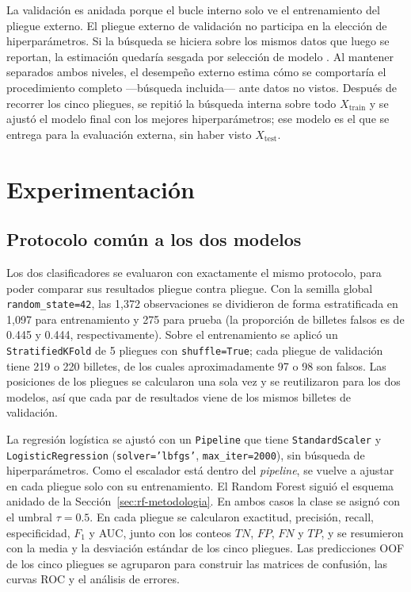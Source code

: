 \documentclass[conference]{IEEEtran}
\begin{document}
    La validación es anidada porque el bucle interno solo ve el entrenamiento del pliegue externo. El pliegue externo de validación no participa en la elección de hiperparámetros. Si la búsqueda se hiciera sobre los mismos datos que luego se reportan, la estimación quedaría sesgada por selección de modelo \cite{cawley2010overfitting,varma2006bias}. Al mantener separados ambos niveles, el desempeño externo estima cómo se comportaría el procedimiento completo —búsqueda incluida— ante datos no vistos. Después de recorrer los cinco pliegues, se repitió la búsqueda interna sobre todo $X_{\text{train}}$ y se ajustó el modelo final con los mejores hiperparámetros; ese modelo es el que se entrega para la evaluación externa, sin haber visto $X_{\text{test}}$.

    
	\section{Experimentación}
	\label{sec:exp}
	
	\subsection{Protocolo común a los dos modelos}
	
	Los dos clasificadores se evaluaron con exactamente el mismo protocolo, para poder comparar sus resultados pliegue contra pliegue. Con la semilla global \texttt{random\_state=42}, las 1,372 observaciones se dividieron de forma estratificada en 1,097 para entrenamiento y 275 para prueba (la proporción de billetes falsos es de 0.445 y 0.444, respectivamente). Sobre el entrenamiento se aplicó un \texttt{StratifiedKFold} de 5 pliegues con \texttt{shuffle=True}; cada pliegue de validación tiene 219 o 220 billetes, de los cuales aproximadamente 97 o 98 son falsos. Las posiciones de los pliegues se calcularon una sola vez y se reutilizaron para los dos modelos, así que cada par de resultados viene de los mismos billetes de validación.
	
	La regresión logística se ajustó con un \texttt{Pipeline} que tiene \texttt{StandardScaler} y \texttt{LogisticRegression} (\texttt{solver='lbfgs'}, \texttt{max\_iter=2000}), sin búsqueda de hiperparámetros. Como el escalador está dentro del \textit{pipeline}, se vuelve a ajustar en cada pliegue solo con su entrenamiento. El Random Forest siguió el esquema anidado de la Sección~\ref{sec:rf-metodologia}. En ambos casos la clase se asignó con el umbral $\tau=0.5$. En cada pliegue se calcularon exactitud, precisión, recall, especificidad, $F_1$ y AUC, junto con los conteos $TN$, $FP$, $FN$ y $TP$, y se resumieron con la media y la desviación estándar de los cinco pliegues. Las predicciones OOF de los cinco pliegues se agruparon para construir las matrices de confusión, las curvas ROC y el análisis de errores.
	
\end{document}
